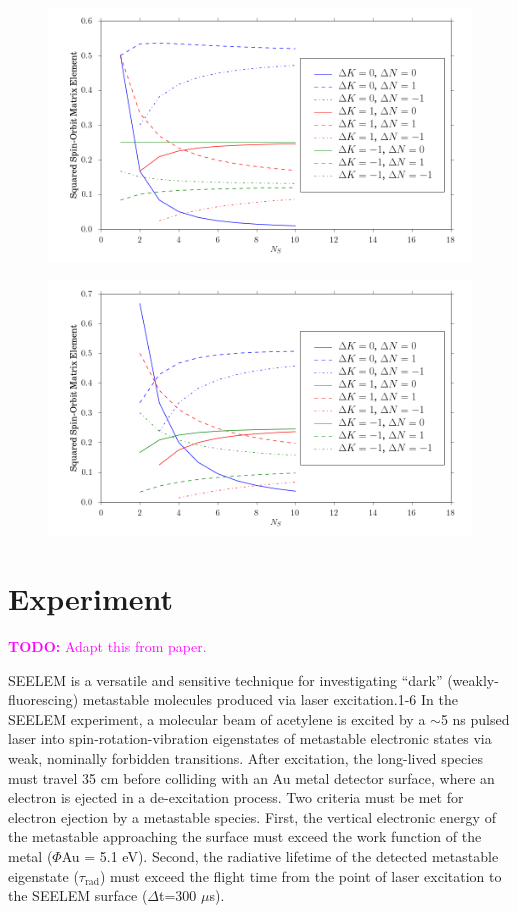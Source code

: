 \documentclass[12pt,draft]{mitthesis}
\newcommand{\TODO} [1]{\textcolor{magenta}{\textbf{TODO:} #1}}
\begin{document}
\begin{figure}
  \caption{}
  \label{fig:rotational-factors-1}
  \centering
  \includegraphics[width=6in]{rotational_factors_k1.png}
\end{figure}

\begin{figure}
  \caption{}
  \label{fig:rotational-factors-2}
  \centering
  \includegraphics[width=6in]{rotational_factors_k2.png}
\end{figure}

\section{Experiment}

\TODO{Adapt this from paper.}

SEELEM is a versatile and sensitive technique for investigating
``dark'' (weakly-fluorescing) metastable molecules produced via laser
excitation.1-6 In the SEELEM experiment, a molecular beam of acetylene
is excited by a $\sim$5 ns pulsed laser into spin-rotation-vibration
eigenstates of metastable electronic states via weak, nominally
forbidden transitions. After excitation, the long-lived species must
travel 35 cm before colliding with an Au metal detector surface, where
an electron is ejected in a de-excitation process. Two criteria must
be met for electron ejection by a metastable species. First, the
vertical electronic energy of the metastable approaching the surface
must exceed the work function of the metal ($\Phi$Au = 5.1
eV). Second, the radiative lifetime of the detected metastable
eigenstate ($\tau_\text{rad}$) must exceed the flight time from the
point of laser excitation to the SEELEM surface ($\Delta$t=300
$\mu$s).
\end{document}
